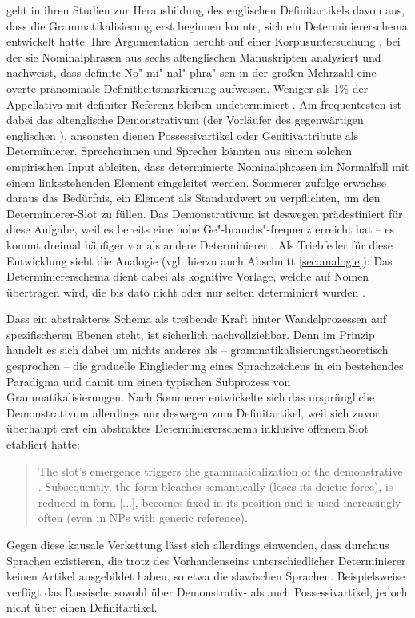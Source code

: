 \textcite{Sommerer2012,Sommerer2015} geht in ihren Studien zur Herausbildung des englischen Definitartikels davon aus, dass die Grammatikalisierung erst beginnen konnte,  sich ein Determiniererschema entwickelt hatte. Ihre Argumentation beruht auf einer  Korpusuntersuchung \parencite[vgl.][197-198]{Sommerer2012}, bei der sie Nominalphrasen aus sechs altenglischen Manuskripten analysiert und nachweist, dass definite No"-mi"-nal"-phra"-sen in der großen Mehrzahl eine overte pränominale Definitheitsmarkierung aufweisen. Weniger als 1\% der Appellativa mit definiter Referenz bleiben undeterminiert \parencite[122]{Sommerer2015}. Am frequentesten ist dabei das altenglische Demonstrativum  (der Vorläufer des gegenwärtigen englischen ), ansonsten dienen Possessivartikel oder Genitivattribute als Determinierer. Sprecherinnen und Sprecher könnten aus einem solchen empirischen Input ableiten, dass determinierte Nominalphrasen im Normalfall mit einem linksstehenden Element eingeleitet werden. Sommerer zufolge erwachse daraus das Bedürfnis, ein Element als Standardwert zu verpflichten, um den Determinierer-Slot zu füllen. Das Demonstrativum  ist deswegen prädestiniert für diese Aufgabe, weil es bereits eine hohe Ge"-brauchs"-frequenz erreicht hat -- es kommt dreimal häufiger vor als andere Determinierer \parencite[125]{Sommerer2015}. Als Triebfeder für diese Entwicklung sieht \citeauthor{Sommerer2015} die Analogie (vgl. hierzu auch Abschnitt \ref{sec:analogie}): Das Determiniererschema dient dabei als kognitive Vorlage, welche auf Nomen übertragen wird, die bis dato nicht oder nur selten determiniert wurden \parencite[125]{Sommerer2015}. 

Dass ein abstrakteres Schema als treibende Kraft hinter Wandelprozessen auf spezifischeren Ebenen steht, ist sicherlich nachvollziehbar. 
Denn im Prinzip handelt es sich dabei um nichts anderes als -- grammatikalisierungstheoretisch gesprochen -- die graduelle Eingliederung eines Sprachzeichens in ein bestehendes Paradigma und damit um einen typischen Subprozess von Grammatikalisierungen. Nach Sommerer entwickelte sich das ursprüngliche Demonstrativum allerdings nur deswegen zum Definitartikel, weil sich zuvor überhaupt erst ein abstraktes Determiniererschema inklusive offenem Slot etabliert hatte: \blockcquote[205]{Sommerer2012}{The slot’s emergence triggers the grammaticalization of the demonstrative . Subsequently, the form bleaches semantically (loses its deictic force), is reduced in form [...], becomes fixed in its position and is used increasingly often (even
in NPs with generic reference).} Gegen diese kausale Verkettung lässt sich allerdings einwenden, dass durchaus Sprachen existieren, die trotz des Vorhandenseins unterschiedlicher Determinierer keinen Artikel ausgebildet haben, so etwa die slawischen Sprachen. Beispielsweise verfügt das Russische sowohl über Demonstrativ- als auch Possessivartikel, jedoch nicht über einen Definitartikel. 
 

